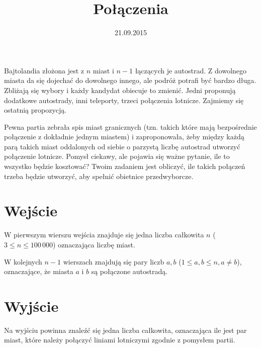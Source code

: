 \documentclass[zad,zawodnik,utf8]{sinol}
\title{Połączenia}
\author{} %
\date{21.09.2015}
\begin{document}
\begin{tasktext}%
Bajtolandia złożona jest z $n$ miast i $n - 1$ łączących je autostrad. Z dowolnego miasta da się dojechać do dowolnego innego, ale podróż potrafi być bardzo długa. Zbliżają się wybory i każdy kandydat obiecuje to zmienić. Jedni proponują dodatkowe autostrady, inni teleporty, trzeci połączenia lotnicze. Zajmiemy się ostatnią propozycją.

Pewna partia zebrała spis miast granicznych (tzn. takich które mają bezpośrednie połączenie z dokładnie jednym miastem) i zaproponowała, żeby między każdą parą takich miast oddalonych od siebie o parzystą liczbę autostrad utworzyć połączenie lotnicze. Pomysł ciekawy, ale pojawia się ważne pytanie, ile to wszystko będzie kosztować? Twoim zadaniem jest obliczyć, ile takich połączeń trzeba będzie utworzyć, aby spełnić obietnice przedwyborcze.

  \section{Wejście}
W pierwszym wierszu wejścia znajduje się jedna liczba całkowita $n$ ($3 \leq n \leq 100\,000$) oznaczająca liczbę miast.

W kolejnych $n - 1$ wierszach znajdują się pary liczb $a, b$ ($1 \leq a, b \leq n, a \neq b$), oznaczające, że miasta $a$ i $b$ są połączone autostradą.

  \section{Wyjście}
Na wyjściu powinna znaleźć się jedna liczba całkowita, oznaczająca ile jest par miast, które należy połączyć liniami lotniczymi zgodnie z pomysłem partii.

\makecompactexample

\end{tasktext}
\end{document}
